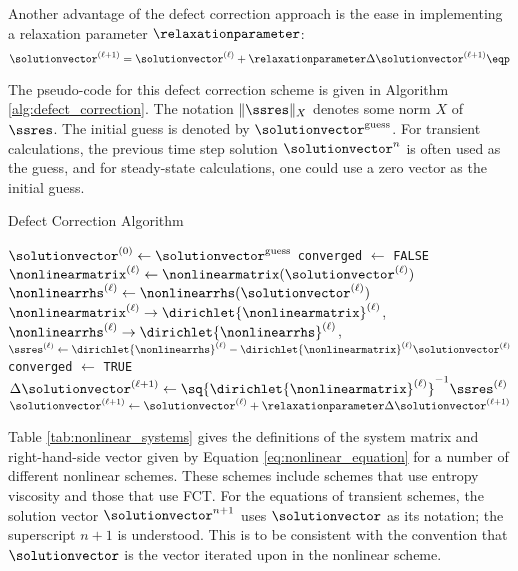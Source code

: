 Another advantage of the defect correction approach is the ease in implementing
a relaxation parameter $\relaxationparameter$:
\begin{equation}
  \solutionvector^{(\ell+1)} = \solutionvector^{(\ell)}
    + \relaxationparameter\Delta\solutionvector^{(\ell+1)} \eqp
\end{equation}

The pseudo-code for this defect correction scheme is given in Algorithm
\ref{alg:defect_correction}.
The notation $\|\ssres\|_X$ denotes some norm $X$ of $\ssres$.
The initial guess is denoted by $\solutionvector^{\text{guess}}$. For
transient calculations, the previous time step solution $\solutionvector^n$
is often used as the guess, and for steady-state calculations, one
could use a zero vector as the initial guess.

\begin{algorithm}[H]
\caption{Defect Correction Algorithm}
\label{alg:defect_correction}
\begin{algorithmic}
\State $\solutionvector^{(0)} \gets \solutionvector^{\text{guess}}$
\State \texttt{converged} $\gets$ \texttt{FALSE}
  \State $\nonlinearmatrix^{(\ell)} \gets
    \nonlinearmatrix(\solutionvector^{(\ell)})$
  \State $\nonlinearrhs^{(\ell)} \gets
    \nonlinearrhs(\solutionvector^{(\ell)})$
  \State $\nonlinearmatrix^{(\ell)} \rightarrow \dirichlet{\nonlinearmatrix}^{(\ell)}$,
    $\nonlinearrhs^{(\ell)} \rightarrow \dirichlet{\nonlinearrhs}^{(\ell)}$,
  \State $\ssres^{(\ell)} \gets \dirichlet{\nonlinearrhs}^{(\ell)}
    - \dirichlet{\nonlinearmatrix}^{(\ell)}\solutionvector^{(\ell)}$
    \State \texttt{converged} $\gets$ \texttt{TRUE}
    \Break
  \EndIf
  \State $\Delta\solutionvector^{(\ell+1)}
    \gets \sq{\dirichlet{\nonlinearmatrix}^{(\ell)}}^{-1}\ssres^{(\ell)}$
  \State $\solutionvector^{(\ell+1)} \gets \solutionvector^{(\ell)}
    + \relaxationparameter\Delta\solutionvector^{(\ell+1)}$
\EndFor
{}
\EndIf
\end{algorithmic}
\end{algorithm}

Table \ref{tab:nonlinear_systems} gives the definitions of the system matrix
and right-hand-side vector given by Equation \eqref{eq:nonlinear_equation}
for a number of different nonlinear schemes. These schemes include schemes
that use entropy viscosity and those that use FCT. For the equations of
transient schemes, the solution vector $\solutionvector^{n+1}$ uses
$\solutionvector$ as its notation; the superscript $n+1$ is understood.
This is to be consistent
with the convention that $\solutionvector$ is the vector iterated upon in
the nonlinear scheme.

